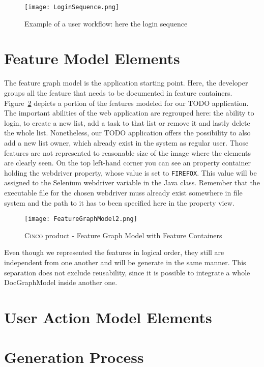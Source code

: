 \begin{figure}[h]
    \centering
    \texttt{[image: LoginSequence.png]}
    \caption{Example of a user workflow: here the login sequence}
    \label{fig:loginSeq}
\end{figure}

\section{Feature Model Elements}\label{sec:FeatModElem}

The feature graph model is the application starting point. Here, the developer groups all the feature that needs to be documented in feature containers. Figure~\ref{fig:featGraph} depicts a portion of the features modeled for our TODO application. The important abilities of the web application are regrouped here: the ability to login, to create a new list, add a task to that list or remove it and lastly delete the whole list. Nonetheless, our TODO application offers the possibility to also add a new list owner, which already exist in the system as regular user. Those features are not represented to reasonable size of the image where the elements are clearly seen. On the top left-hand corner you can see an property container holding the webdriver property, whose value is set to \lstinline[language=MGL]{FIREFOX}. This value will be assigned to the Selenium webdriver variable in the Java class. Remember that the executable file for the chosen webdriver muss already exist somewhere in file system and the path to it has to been specified here in the property view.

\begin{figure}[H]
    \centering
    \texttt{[image: FeatureGraphModel2.png]}
    \caption{\textsc{Cinco} product - Feature Graph Model with Feature Containers}
    \label{fig:featGraph}
\end{figure}

Even though we represented the features in logical order, they still are independent from one another and will be generate in the same manner. This separation does not exclude reusability, since it is possible to integrate a whole DocGraphModel inside another one.

\section{User Action Model Elements}\label{sec:DocModElem}


\section{Generation Process}\label{sec:GenProcess}

